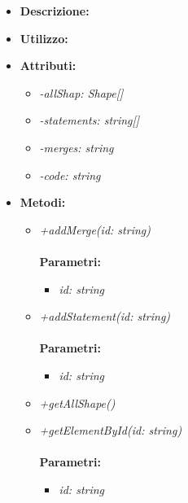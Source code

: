 \begin{itemize}
	\item \textbf{Descrizione:}\\
	
	\item \textbf{Utilizzo:}\\
	
	\item \textbf{Attributi:}
		\begin{itemize}
			\item \emph{-allShap: Shape[]}\\
			
			\item \emph{-statements: string[]}\\
			
			\item \emph{-merges: string}\\
			
			\item \emph{-code: string}\\
			
		\end{itemize}
	\item \textbf{Metodi:}
		\begin{itemize}
			\item \emph{+addMerge(id: string)}\\
    		\\
    		\textbf{Parametri:}
    		\begin{itemize}
    			\item \emph{id: string}\\
    			
    		\end{itemize}
    		\item \emph{+addStatement(id: string)}\\
    		\\
    		\textbf{Parametri:}
    		\begin{itemize}
    			\item \emph{id: string}\\
    			
    		\end{itemize}
    		\item \emph{+getAllShape()}\\
    		
    		\item \emph{+getElementById(id: string)}\\
    		\\
    		\textbf{Parametri:}
    		\begin{itemize}
    			\item \emph{id: string}\\
    			

\end{itemize}
\end{itemize}
\end{itemize}
